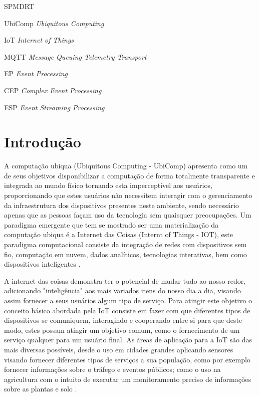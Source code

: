 \documentclass[tid,table]{texufpel} %
\begin{document}
\listoffigures


\begin{listofabbrv}{SPMDRT}
	
       
	\item[UbiComp] \textit{Ubiquitous Computing}
	\item[IoT] \textit{Internet of Things}
	\item[MQTT] \textit{Message Queuing Telemetry Transport}
	\item[EP] \textit{Event Processing}
	\item[CEP] \textit{Complex Event Processing}
	\item[ESP] \textit{Event Streaming Processing}
        
\end{listofabbrv}

\tableofcontents

\chapter{Introdução}

A computação ubiqua (Ubiquitous Computing - UbiComp) apresenta como um de seus objetivos  disponibilizar a computação de forma totalmente transparente e integrada ao mundo físico tornando esta imperceptível aos usuários, proporcionando que estes usuários não necessitem interagir com o gerenciamento da infraestrutura dos dispositivos presentes neste ambiente, sendo necessário apenas que as pessoas façam uso da tecnologia sem quaisquer preocupações. Um paradigma emergente que tem se mostrado ser uma materialização da computação ubiqua é a Internet das Coisas (Internt of Things - IOT), este paradigma computacional consiste da integração de redes com dispositivos sem fio, computação em nuvem, dados analíticos, tecnologias interativas, bem como dispositivos inteligentes \cite{weiser1999computer}. 

A internet das coisas demonstra ter o potencial de mudar tudo ao nosso redor, adicionando "inteligência" aos mais variados itens do nosso dia a dia, visando assim fornecer a seus usuários algum tipo de serviço. Para atingir este objetivo o conceito básico abordada pela IoT consiste em fazer com que diferentes tipos de dispositivos se comuniquem, interagindo e cooperando entre si para que deste modo, estes possam atingir um objetivo comum, como o fornecimento de um serviço qualquer para um usuário final. As áreas de aplicação para a IoT são das mais diversas possíveis, desde o uso em cidades grandes aplicando sensores visando fornecer diferentes tipos de serviços a sua população, como por exemplo fornecer informações sobre o tráfego e eventos públicos; como o uso na agricultura com o intuito de executar um monitoramento preciso de  informações sobre as plantas e solo \cite{gonccalves2017research}.
\end{document}
